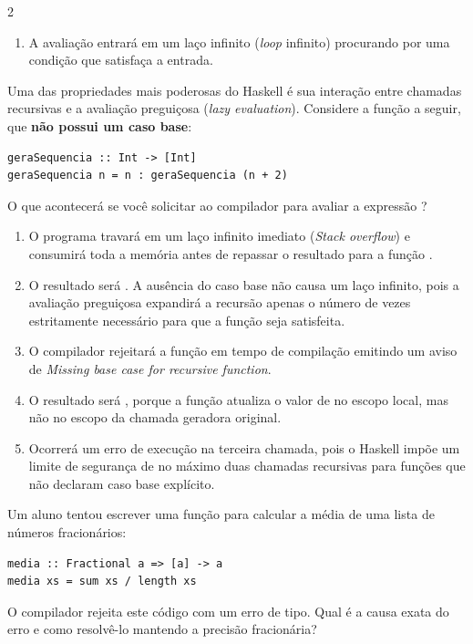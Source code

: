 \documentclass[a4paper,10pt,brazil]{article}
\begin{document}
\begin{multicols}{2}
\begin{enumerate}
  \item A avaliação entrará em um laço infinito (\emph{loop} infinito) procurando por uma condição que satisfaça a entrada.


\end{enumerate}

Uma das propriedades mais poderosas do Haskell é sua interação entre chamadas recursivas e a avaliação preguiçosa (\emph{lazy evaluation}). Considere a função a seguir, que \textbf{não possui um caso base}:

\begin{verbatim}
geraSequencia :: Int -> [Int]
geraSequencia n = n : geraSequencia (n + 2)
\end{verbatim}

O que acontecerá se você solicitar ao compilador para avaliar a expressão ?

\begin{enumerate}
  \item O programa travará em um laço infinito imediato (\emph{Stack overflow}) e consumirá toda a memória antes de repassar o resultado para a função .

  \item O resultado será \haskellinline{[10, 12, 14]}. A ausência do caso base não causa um laço infinito, pois a avaliação preguiçosa expandirá a recursão apenas o número de vezes estritamente necessário para que a função  seja satisfeita.

  \item O compilador rejeitará a função  em tempo de compilação emitindo um aviso de \emph{Missing base case for recursive function}.

  \item O resultado será \haskellinline{[10, 10, 10]}, porque a função atualiza o valor de  no escopo local, mas não no escopo da chamada geradora original.

  \item Ocorrerá um erro de execução na terceira chamada, pois o Haskell impõe um limite de segurança de no máximo duas chamadas recursivas para funções que não declaram caso base explícito.

\end{enumerate}

Um aluno tentou escrever uma função para calcular a média de uma lista de números fracionários:
\begin{verbatim}
media :: Fractional a => [a] -> a
media xs = sum xs / length xs
\end{verbatim}
O compilador rejeita este código com um erro de tipo. Qual é a causa exata do erro e como resolvê-lo mantendo a precisão fracionária?


\end{multicols}
\end{document}
